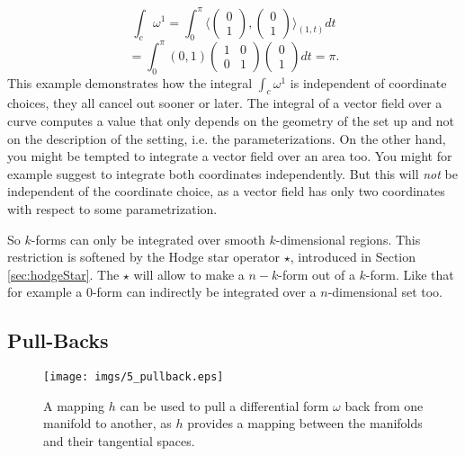\[\int_c \omega^1 = \int_0 ^\pi \langle \begin{pmatrix}
	0 \\ 1
\end{pmatrix},  \begin{pmatrix}
	0 \\ 1
\end{pmatrix}\rangle_{(1,t)} dt\]
\[= \int_0^\pi (0,1) \begin{pmatrix}
	1 & 0 \\
	0 & 1
\end{pmatrix}\begin{pmatrix}
	0 \\
	1
\end{pmatrix} dt = \pi.\]
This example demonstrates how the integral $\int_c \omega^1$ is independent of coordinate choices, they all cancel out sooner or later. The integral of a vector field over a curve computes a value that only depends on the geometry of the set up and not on the description of the setting, i.e. the parameterizations.
On the other hand, you might be tempted to integrate a vector field over an area too. You might for example suggest to integrate both coordinates independently. But this will \emph{not} be independent of the coordinate choice, as a vector field has only two coordinates with respect to some parametrization. 

So $k$-forms can only be integrated over smooth $k$-dimensional regions. This restriction is softened by the Hodge star operator $\star$, introduced in Section \ref{sec:hodgeStar}. The $\star$ will allow to make a $n-k$-form out of a $k$-form. Like that for example a $0$-form can indirectly be integrated over a $n$-dimensional set too.

\subsection{Pull-Backs}
\label{sec:pullbacks}

\begin{figure}%
\begin{center}
\texttt{[image: imgs/5\_pullback.eps]}%
\end{center}
\caption{A mapping $h$ can be used to pull a differential form $\omega$ back from one manifold to another, as $h$ provides a mapping between the manifolds and their tangential spaces. }%
\label{fig:5_pullback}%
\end{figure}

